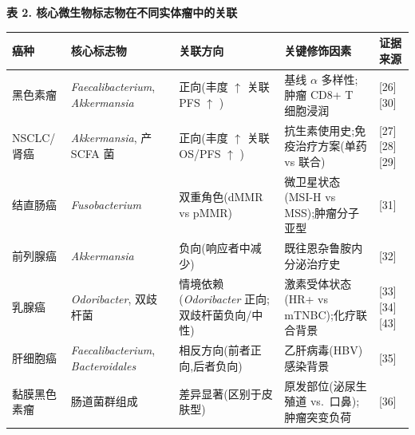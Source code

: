 \textbf{表 2. 核心微生物标志物在不同实体瘤中的关联}

{\def\LTcaptype{none} %
\begin{longtable}[]{@{}
  >{\raggedright\arraybackslash}p{}
  >{\raggedright\arraybackslash}p{}
  >{\raggedright\arraybackslash}p{}
  >{\raggedright\arraybackslash}p{}
  >{\raggedright\arraybackslash}p{}@{}}
\toprule\noalign{}
\begin{minipage}[b]{\linewidth}\raggedright
癌种
\end{minipage} & \begin{minipage}[b]{\linewidth}\raggedright
核心标志物
\end{minipage} & \begin{minipage}[b]{\linewidth}\raggedright
关联方向
\end{minipage} & \begin{minipage}[b]{\linewidth}\raggedright
关键修饰因素
\end{minipage} & \begin{minipage}[b]{\linewidth}\raggedright
证据来源
\end{minipage} \\
\midrule\noalign{}
\endhead
\bottomrule\noalign{}
\endlastfoot
黑色素瘤 & \emph{Faecalibacterium}, \emph{Akkermansia} & 正向(丰度 \(\uparrow\) 关联 PFS \(\uparrow\) ) & 基线 \(\alpha\) 多样性;肿瘤 CD8+ T 细胞浸润 & {[}26{]}{[}30{]} \\
NSCLC/肾癌 & \emph{Akkermansia}, 产 SCFA 菌 & 正向(丰度 \(\uparrow\) 关联 OS/PFS \(\uparrow\) ) & 抗生素使用史;免疫治疗方案(单药 vs 联合) & {[}27{]}{[}28{]}{[}29{]} \\
结直肠癌 & \emph{Fusobacterium} & 双重角色(dMMR vs pMMR) & 微卫星状态(MSI-H vs MSS);肿瘤分子亚型 & {[}31{]} \\
前列腺癌 & \emph{Akkermansia} & 负向(响应者中减少) & 既往恩杂鲁胺内分泌治疗史 & {[}32{]} \\
乳腺癌 & \emph{Odoribacter}, 双歧杆菌 & 情境依赖(\emph{Odoribacter} 正向;双歧杆菌负向/中性) & 激素受体状态(HR+ vs mTNBC);化疗联合背景 & {[}33{]}{[}34{]}{[}43{]} \\
肝细胞癌 & \emph{Faecalibacterium}, \emph{Bacteroidales} & 相反方向(前者正向,后者负向) & 乙肝病毒(HBV)感染背景 & {[}35{]} \\
黏膜黑色素瘤 & 肠道菌群组成 & 差异显著(区别于皮肤型) & 原发部位(泌尿生殖道 vs.~口鼻);肿瘤突变负荷 & {[}36{]} \\
\end{longtable}
}

